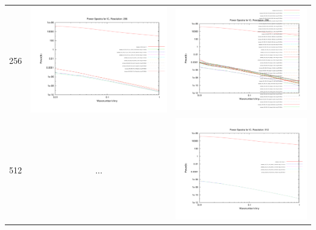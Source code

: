 \begin{itemize}
\begin{table}
\begin{tabular}{l|c|c}
 256 & \includegraphics[scale=0.2]{analysis/powerspectra/IC_powspec_combined_256_h70.pdf} & \includegraphics[scale=0.2]{analysis/powerspectra/IC_powspec_combined_256_h100.pdf} \\
 512 & $\dots$ & \includegraphics[scale=0.2]{analysis/powerspectra/IC_powspec_combined_512_h100.pdf} \\


\end{tabular}
\end{table}
\end{itemize}
